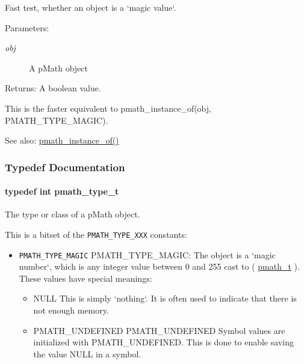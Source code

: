 Fast test, whether an object is a `magic value`. 

\begin{Desc}
\item[Parameters:]
\begin{description}
\item[{\em obj}]A pMath object \end{description}
\end{Desc}
\begin{Desc}
\item[Returns:]A boolean value.\end{Desc}
This is the faster equivalent to pmath\_\-instance\_\-of(obj, PMATH\_\-TYPE\_\-MAGIC).

\begin{Desc}
\item[See also:]\hyperlink{classpmath__t_0bd527f1ec2db8f1eba58e1fd84babbc}{pmath\_\-instance\_\-of()} \end{Desc}


\subsubsection{Typedef Documentation}
\hypertarget{group__objects_ge2646df76dcb0113715322b13a1f36f0}{
\paragraph[{pmath\_\-type\_\-t}]{\setlength{\rightskip}{0pt plus 5cm}typedef int {\bf pmath\_\-type\_\-t}}\hfill}
\label{group__objects_ge2646df76dcb0113715322b13a1f36f0}


The type or class of a pMath object. 

This is a bitset of the {\tt PMATH\_\-TYPE\_\-XXX} constants:

\begin{itemize}
\item {\tt PMATH\_\-TYPE\_\-MAGIC} PMATH\_\-TYPE\_\-MAGIC: The object is a `magic number`, which is any integer value between 0 and 255 cast to ( \hyperlink{classpmath__t}{pmath\_\-t} ). These values have special meanings:\begin{itemize}
\item NULL This is simply `nothing`. It is often used to indicate that there is not enough memory.\item PMATH\_\-UNDEFINED PMATH\_\-UNDEFINED Symbol values are initialized with PMATH\_\-UNDEFINED. This is done to enable saving the value NULL in a symbol.\end{itemize}
\end{itemize}


